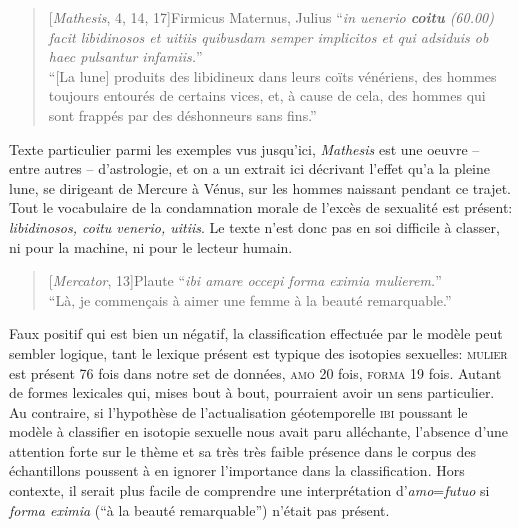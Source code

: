 \starbreak

\begin{quote}[\textit{Mathesis}, 4, 14, 17]{Firmicus Maternus, Julius}
    \enquote{\textit{in uenerio \textbf{coitu} (60.00) facit libidinosos et uitiis quibusdam semper implicitos et qui adsiduis ob haec pulsantur infamiis.}} \\
    \enquote{[La lune] produits des libidineux dans leurs coïts vénériens, des hommes toujours entourés de certains vices, et, à cause de cela, des hommes qui sont frappés par des déshonneurs sans fins.}
\end{quote}

Texte particulier parmi les exemples vus jusqu'ici, \textit{Mathesis} est une oeuvre -- entre autres -- d'astrologie, et on a un extrait ici décrivant l'effet qu'a la pleine lune, se dirigeant de Mercure à Vénus, sur les hommes naissant pendant ce trajet. Tout le vocabulaire de la condamnation morale de l'excès de sexualité est présent: \textit{libidinosos, coitu venerio, uitiis}. %
Le texte n'est donc pas en soi difficile à classer, ni pour la machine, ni pour le lecteur humain.

\starbreak

\begin{quote}[\textit{Mercator}, 13]{Plaute}
    \enquote{\textit{ibi amare occepi forma eximia mulierem.}} \\
    \enquote{Là, je commençais à aimer une femme à la beauté remarquable.}
\end{quote}

Faux positif qui est bien un négatif, la classification effectuée par le modèle peut sembler logique, tant le lexique présent est typique des isotopies sexuelles: \textsc{mulier} est présent 76 fois dans notre set de données, \textsc{amo} 20 fois, \textsc{forma} 19 fois. Autant de formes lexicales qui, mises bout à bout, pourraient avoir un sens particulier. Au contraire, si l'hypothèse de l'actualisation géotemporelle \textsc{ibi} poussant le modèle à classifier en isotopie sexuelle nous avait paru alléchante, l'absence d'une attention forte sur le thème et sa très très faible présence dans le corpus des échantillons poussent à en ignorer l'importance dans la classification. Hors contexte, il serait plus facile de comprendre une interprétation d'\textit{amo}=\textit{futuo} si \textit{forma eximia} (\enquote{à la beauté remarquable}) n'était pas présent.

